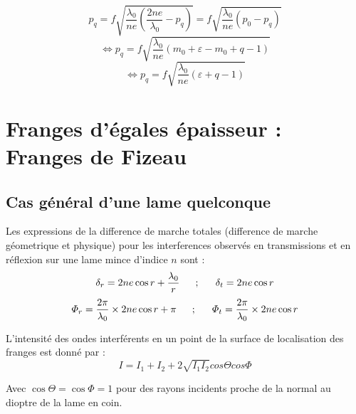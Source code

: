 \documentclass[a4paper,12pt]{article}
\theoremstyle{StyleTheo_will}
\theoremstyle{remark}
\begin{document}
\[p_q = f\sqrt{\frac{\lambda_0}{ne}\left(\frac{2ne}{\lambda_0} - p_q\right)} = f\sqrt{\frac{\lambda_0}{ne}\left(p_0 - p_q\right)}\]
\[ \Leftrightarrow p_q = f\sqrt{\frac{\lambda_0}{ne}\left(m_0 + \varepsilon -m_0 +q -1\right)}\]
\[ \Leftrightarrow p_q = f\sqrt{\frac{\lambda_0}{ne}\left(\varepsilon +q -1\right)}\]

\begin{center}
\end{center}

\section{Franges d'égales épaisseur : Franges de Fizeau}
\subsection{Cas général d'une lame quelconque}

Les expressions de la difference de marche totales (difference de marche géometrique et physique) pour les interferences observés en transmissions et en réflexion sur une lame mince d'indice $n$ sont :
\[
\delta_r = 2ne\cos r +\frac{\lambda_0}{r}\verb|   |;\verb|   |\delta_t = 2ne\cos r
\]\[
\varPhi_r = \frac{2\pi}{\lambda_0}\times 2ne \cos r + \pi\verb|   |;\verb|   |\varPhi_t = \frac{2\pi}{\lambda_0}\times 2ne \cos r
\]

L'intensité des ondes interférents en un point de la surface de localisation des franges est donné par :
\[ I = I_1 +I_2+2\sqrt{I_1I_2}cos\Theta  cos \Phi\]

Avec $\cos\Theta = \cos\varPhi = 1$ pour des rayons incidents proche de la normal au dioptre de la lame en coin.
\end{document}
